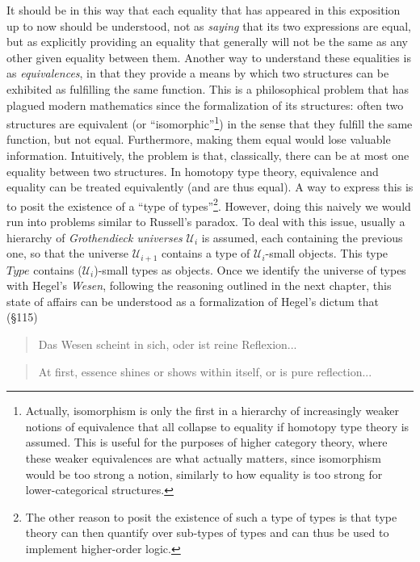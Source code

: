 \documentclass{article}
\begin{document}
It should be in this way that each equality that has appeared in this exposition up to now should be understood, not as \emph{saying} that its two expressions are equal, but as explicitly providing an equality that generally will not be the same as any other given equality between them. Another way to understand these equalities is as \emph{equivalences}, in that they provide a means by which two structures can be exhibited as fulfilling the same function. This is a philosophical problem that has plagued modern mathematics since the formalization of its structures: often two structures are equivalent (or ``isomorphic''\footnote{Actually, isomorphism is only the first in a hierarchy of increasingly weaker notions of equivalence that all collapse to equality if homotopy type theory is assumed. This is useful for the purposes of higher category theory, where these weaker equivalences are what actually matters, since isomorphism would be too strong a notion, similarly to how equality is too strong for lower-categorical structures.}) in the sense that they fulfill the same function, but not equal. Furthermore, making them equal would lose valuable information. Intuitively, the problem is that, classically, there can be at most one equality between two structures. In homotopy type theory, equivalence and equality can be treated equivalently (and are thus equal). A way to express this is to posit the existence of a ``type of types''\footnote{The other reason to posit the existence of such a type of types is that type theory can then quantify over sub-types of types and can thus be used to implement higher-order logic.}. However, doing this naively we would run into problems similar to Russell's paradox. To deal with this issue, usually a hierarchy of \emph{Grothendieck universes} $\mathcal{U}_i$ is assumed, each containing the previous one, so that the universe $\mathcal{U}_{i+1}$ contains a type of $\mathcal{U}_i$-small objects. This type $Type$ contains ($\mathcal{U}_i$)-small types as objects. Once we identify the universe of types with Hegel's \emph{Wesen}, following the reasoning outlined in the next chapter, this state of affairs can be understood as a formalization of Hegel's dictum that (§115)

\begin{quote}
    Das Wesen scheint in sich, oder ist  reine Reflexion...
\end{quote}

\begin{quote}
    At first, essence shines or shows within itself, or is pure reflection...
\end{quote}
\end{document}
